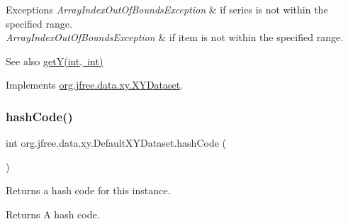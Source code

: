 \begin{DoxyExceptions}{Exceptions}
{\em Array\+Index\+Out\+Of\+Bounds\+Exception} & if {\ttfamily series} is not within the specified range. \\
\hline
{\em Array\+Index\+Out\+Of\+Bounds\+Exception} & if {\ttfamily item} is not within the specified range.\\
\hline
\end{DoxyExceptions}
\begin{DoxySeeAlso}{See also}
\mbox{\hyperlink{classorg_1_1jfree_1_1data_1_1xy_1_1_default_x_y_dataset_a8ad15161967d0f527b5fa885ebc14bc6}{get\+Y(int, int)}} 
\end{DoxySeeAlso}


Implements \mbox{\hyperlink{interfaceorg_1_1jfree_1_1data_1_1xy_1_1_x_y_dataset_a5e86389417eb5ed7b663a952ca370914}{org.\+jfree.\+data.\+xy.\+X\+Y\+Dataset}}.

\mbox{\label{classorg_1_1jfree_1_1data_1_1xy_1_1_default_x_y_dataset_afa686c5effe2f7eaebccc69e0845a563}} 
\subsubsection{\texorpdfstring{hash\+Code()}{hashCode()}}
{\footnotesize\ttfamily int org.\+jfree.\+data.\+xy.\+Default\+X\+Y\+Dataset.\+hash\+Code (\begin{DoxyParamCaption}{ }\end{DoxyParamCaption})}

Returns a hash code for this instance.

\begin{DoxyReturn}{Returns}
A hash code. 
\end{DoxyReturn}
\mbox{\label{classorg_1_1jfree_1_1data_1_1xy_1_1_default_x_y_dataset_a436e2b868c431a1d9bc4ce560749334c}} 
